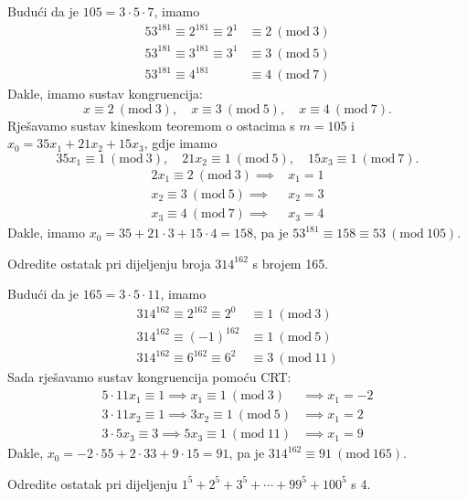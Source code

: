 \documentclass{exam}
\newcommand{\Mod}[1]{\ (\mathrm{mod}\ #1)}
\begin{document}
\begin{questions}
\begin{solution}
  Budući da je $105 = 3 \cdot 5 \cdot 7$, imamo
  \begin{align*}
    53^{181} \equiv 2^{181} \equiv 2^{1} &\equiv 2 \Mod{3}\\
    53^{181} \equiv 3^{181} \equiv 3^{1} &\equiv 3 \Mod{5}\\
    53^{181} \equiv 4^{181} &\equiv 4 \Mod{7}
  \end{align*}
  Dakle, imamo sustav kongruencija:
  \[
    x \equiv 2 \Mod{3}, \quad x \equiv 3 \Mod{5}, \quad x \equiv 4 \Mod{7}.
  \]
  Rješavamo sustav kineskom teoremom o ostacima s $m = 105$ i $x_0 = 35x_1 + 21x_2 + 15x_3$, gdje imamo
  \[
    35 x_1 \equiv 1 \Mod{3}, \quad 21 x_2 \equiv 1 \Mod{5}, \quad 15 x_3 \equiv 1 \Mod{7}.
  \]
  \begin{align*}
    2 x_1 \equiv 2 \Mod{3} \implies &x_1 = 1\\
    x_2 \equiv 3 \Mod{5} \implies &x_2 = 3\\
    x_3 \equiv 4 \Mod{7} \implies &x_3 = 4
  \end{align*}
  Dakle, imamo $x_0 = 35 + 21 \cdot 3 + 15 \cdot 4 = 158$, pa je $53^{181} \equiv 158 \equiv 53 \Mod{105}$.
\end{solution}

\question Odredite ostatak pri dijeljenju broja $314^{162}$ s brojem 165.

\begin{solution}
  Budući da je $165 = 3 \cdot 5 \cdot 11$, imamo
  \begin{align*}
    314^{162} \equiv 2^{162} \equiv 2^{0} &\equiv 1 \Mod{3}\\
    314^{162} \equiv (-1)^{162} &\equiv 1 \Mod{5}\\
    314^{162} \equiv 6^{162} \equiv 6^2 &\equiv 3 \Mod{11}
  \end{align*}
  Sada rješavamo sustav kongruencija pomoću CRT:
  \begin{align*}
    5 \cdot 11 x_1 \equiv 1 \implies x_1 \equiv 1 \Mod{3} &\implies x_1 = -2\\
    3 \cdot 11 x_2 \equiv 1 \implies 3 x_2 \equiv 1 \Mod{5} &\implies x_1 = 2\\
    3 \cdot 5 x_3 \equiv 3 \implies 5 x_3 \equiv 1 \Mod{11} &\implies x_1 = 9
  \end{align*}
  Dakle, $x_0 = -2 \cdot 55 + 2 \cdot 33 + 9 \cdot 15 = 91$, pa je $314^{162} \equiv 91 \Mod{165}$.
\end{solution}

\question Odredite ostatak pri dijeljenju $1^5 + 2^5 + 3^5 + \cdots + 99^5 + 100^5$ s 4.


\end{questions}
\end{document}
